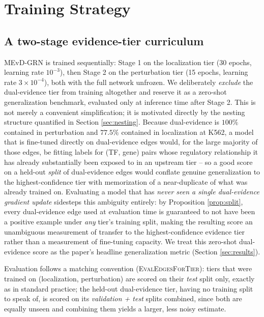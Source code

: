 \documentclass{article}
\theoremstyle{plain}
\theoremstyle{definition}
\begin{document}
\section{Training Strategy}
\label{sec:curriculum}

\subsection{A two-stage evidence-tier curriculum}
\label{sec:two-stage}
MEvD-GRN is trained sequentially: Stage 1 on the localization tier (30 epochs,
learning rate $10^{-3}$), then Stage 2 on the perturbation tier (15 epochs,
learning rate $3{\times}10^{-4}$), both with the full network unfrozen. We
deliberately \emph{exclude} the dual-evidence tier from training altogether and
reserve it as a zero-shot generalization benchmark, evaluated only at
inference time after Stage 2. This is not merely a convenient simplification;
it is motivated directly by the nesting structure quantified in Section
\ref{sec:nesting}. Because dual-evidence is $100\%$ contained in perturbation
and $77.5\%$ contained in localization at K562, a model that is fine-tuned
directly on dual-evidence edges would, for the large majority of those edges,
be fitting labels for (TF, gene) pairs whose regulatory relationship it has
already substantially been exposed to in an upstream tier -- so a good score
on a held-out \emph{split} of dual-evidence edges would conflate genuine
generalization to the highest-confidence tier with memorization of a
near-duplicate of what was already trained on. Evaluating a model that has
\emph{never seen a single dual-evidence gradient update} sidesteps this
ambiguity entirely: by Proposition \ref{prop:split}, every dual-evidence edge
used at evaluation time is guaranteed to not have been a positive example under
\emph{any} tier's training split, making the resulting score an unambiguous
measurement of transfer to the highest-confidence evidence tier rather than a
measurement of fine-tuning capacity. We treat this zero-shot dual-evidence
score as the paper's headline generalization metric (Section
\ref{sec:results}).

Evaluation follows a matching convention (\textsc{EvalEdgesForTier}): tiers
that were trained on (localization, perturbation) are scored on their
\emph{test} split only, exactly as in standard practice; the held-out
dual-evidence tier, having no training split to speak of, is scored on its
\emph{validation + test} splits combined, since both are equally unseen and
combining them yields a larger, less noisy estimate.
\end{document}
